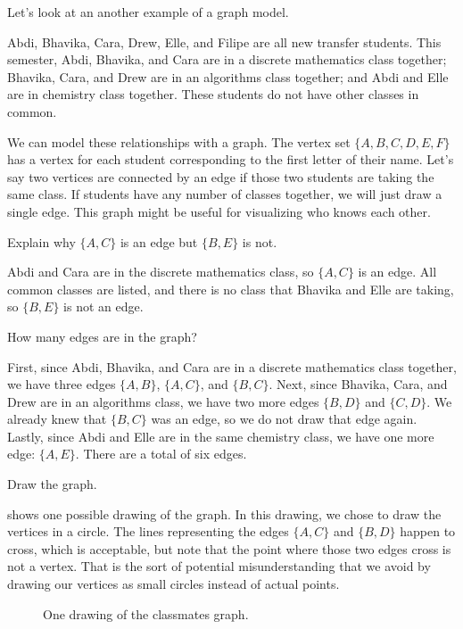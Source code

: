 Let's look at an another example of a graph model.

\begin{exam}
\label{exam_classmates_graph}
    Abdi, Bhavika, Cara, Drew, Elle, and Filipe are all new transfer students. This semester, Abdi, Bhavika, and Cara are in a discrete mathematics class together; Bhavika, Cara, and Drew are in an algorithms class together; and Abdi and Elle are in chemistry class together.  These students do not have other classes in common. 
    
    We can model these relationships with a graph.  The vertex set $\{A,B,C,D,E,F\}$ has a vertex for each student corresponding to the first letter of their name.  
    Let's say two vertices are connected by an edge if those two students are taking the same class. If students have any number of classes together, we will just draw a single edge.  This graph might be useful for visualizing who knows each other.
    \begin{apart}
        \item Explain why $\{A,C\}$ is an edge but $\{B,E\}$ is not.
            \begin{soln}
                Abdi and Cara are in the discrete mathematics class, so $\{A,C\}$ is an edge.  All common classes are listed, and there is no class that Bhavika and Elle are taking, so $\{B,E\}$ is not an edge.
            \end{soln}
        \item How many edges are in the graph?
            \begin{soln}
                First, since Abdi, Bhavika, and Cara are in a discrete mathematics class together, we have three edges $\{A,B\}$, $\{A,C\}$, and $\{B,C\}$.
                Next, since Bhavika, Cara, and Drew are in an algorithms class, we have two more edges $\{B,D\}$ and $\{C,D\}$. We already knew that $\{B,C\}$ was an edge, so we do not draw that edge again.
                Lastly, since Abdi and Elle are in the same chemistry class, we have one more edge: $\{A,E\}$.  There are a total of six edges.
            \end{soln} 
        \item Draw the graph.
            \begin{soln}
                 shows one possible drawing of the graph.  In this drawing, we chose to draw the vertices in a circle.  The lines representing the edges $\{A,C\}$ and $\{B,D\}$ happen to cross, which is acceptable, but note that the point where those two edges cross is not a vertex. That is the sort of potential misunderstanding that we avoid by drawing our vertices as small circles instead of actual points.

                \begin{figure}[hbtp]
                    \centering
                    
                    \caption{One drawing of the classmates graph.}
                    \label{fig_classmates_graph}
                \end{figure}            
            \end{soln}
    \end{apart}
\end{exam}

